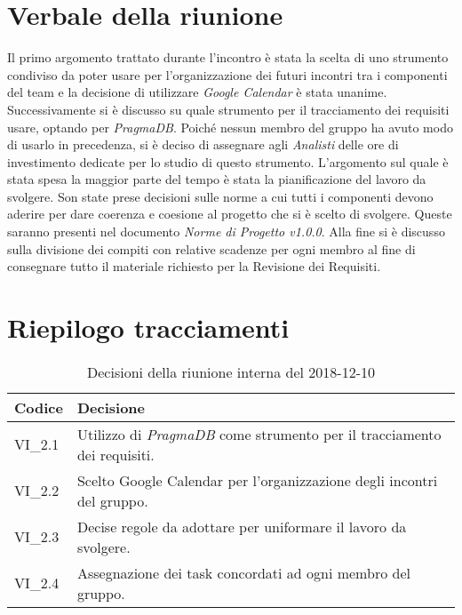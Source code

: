 \section{Verbale della riunione}
Il primo argomento trattato durante l'incontro è stata la scelta di uno strumento 
condiviso da poter usare per l'organizzazione dei futuri incontri tra i componenti
del team e la decisione di utilizzare \textit{Google Calendar} è stata unanime.
Successivamente si è discusso su quale strumento per il tracciamento dei requisiti
usare, optando per \textit{PragmaDB}\glo{}. Poiché nessun membro del gruppo ha 
avuto modo di usarlo in precedenza, si è deciso di assegnare agli \textit{Analisti}
delle ore di investimento dedicate per lo studio di questo strumento. 
L'argomento sul quale è stata spesa la maggior parte del tempo è stata la 
pianificazione del lavoro da svolgere. Son state prese decisioni sulle norme a
cui tutti i componenti devono aderire per dare coerenza e coesione al progetto
che si è scelto di svolgere. Queste saranno presenti nel documento 
\textit{Norme di Progetto v1.0.0}. Alla fine si è discusso sulla divisione dei 
compiti con relative scadenze per ogni membro al fine di consegnare tutto il 
materiale richiesto per la Revisione dei Requisiti. 
\pagebreak
\section{Riepilogo tracciamenti}

	
\begin{longtable}{ >{\centering}p{} >{}p{}}
	\caption{Decisioni della riunione interna del 2018-12-10}\\	
	\rowcolorhead
	\textbf{\color{white}Codice} 
	& \centering\textbf{\color{white}Decisione} 
	\tabularnewline 
	\endfirsthead
		VI\_2.1 & Utilizzo di \textit{PragmaDB} come strumento per il tracciamento dei
				requisiti.
		
		\tabularnewline 
		VI\_2.2 & Scelto Google Calendar per l'organizzazione degli 
				incontri del gruppo.
		
		\tabularnewline 
		VI\_2.3 & Decise regole da adottare per uniformare il lavoro da svolgere.
	
		\tabularnewline 
		VI\_2.4 & Assegnazione dei task concordati ad ogni membro del gruppo.
	
	\end{longtable}
	



